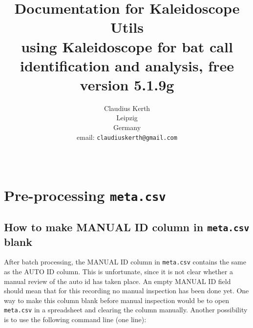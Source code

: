 \documentclass[English, 11pt, twoside, authoryear]{article}
\begin{document}
%
\title{ Documentation for \textsf{Kaleidoscope Utils}  \\
\vspace{20pt}
\normalsize{using \textsf{Kaleidoscope} for bat call identification and analysis, free version 5.1.9g}\vspace{100pt}}

%
%
\author{Claudius Kerth\\Leipzig\\Germany\\email: \texttt{claudiuskerth@gmail.com}}
%
%
\date{~} %
%
%
%
%
%
%
\maketitle
%

\thispagestyle{empty} %
%
%
\tableofcontents %
%
%
\clearpage %
\setcounter{page}{1} %
%
%
%
%
%
\onecolumn


%
%
%
\section{Pre-processing \texttt{meta.csv}}

%
%
%
\subsection{How to make MANUAL ID column in \texttt{meta.csv} blank}
%
%
%
After batch processing, the MANUAL ID column in \texttt{meta.csv} contains the same as the AUTO ID column. This is unfortunate, since it is not clear whether a manual review of the auto id has taken place. An empty MANUAL ID field should mean that for this recording no manual inspection has been done yet. One way to make this column blank before manual inspection would be to open \texttt{meta.csv} in a spreadsheet and clearing the column manually. Another possibility is to use the following command line (one line):
\end{document}

